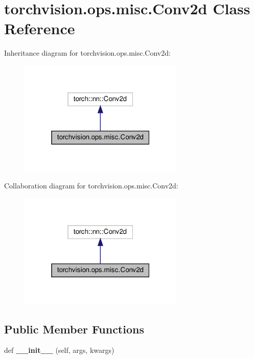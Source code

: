 \hypertarget{classtorchvision_1_1ops_1_1misc_1_1Conv2d}{}\section{torchvision.\+ops.\+misc.\+Conv2d Class Reference}
\label{classtorchvision_1_1ops_1_1misc_1_1Conv2d}


Inheritance diagram for torchvision.\+ops.\+misc.\+Conv2d\+:
\nopagebreak
\begin{figure}[H]
\begin{center}
\leavevmode
\includegraphics[width=223pt]{classtorchvision_1_1ops_1_1misc_1_1Conv2d__inherit__graph}
\end{center}
\end{figure}


Collaboration diagram for torchvision.\+ops.\+misc.\+Conv2d\+:
\nopagebreak
\begin{figure}[H]
\begin{center}
\leavevmode
\includegraphics[width=223pt]{classtorchvision_1_1ops_1_1misc_1_1Conv2d__coll__graph}
\end{center}
\end{figure}
\subsection*{Public Member Functions}
\begin{DoxyCompactItemize}
\item 
\mbox{\label{classtorchvision_1_1ops_1_1misc_1_1Conv2d_a05c54edf8f10048f022b90ea17395b64}} 
def {\bfseries \+\_\+\+\_\+init\+\_\+\+\_\+} (self, args, kwargs)
\end{DoxyCompactItemize}


